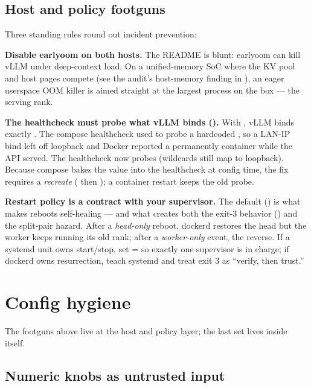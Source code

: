 \subsection{Host and policy footguns}

Three standing rules round out incident prevention:

\textbf{Disable earlyoom on both hosts.} The README is blunt: earlyoom can
kill vLLM under deep-context load. On a unified-memory SoC where the KV pool
and host pages compete (see the audit's host-memory finding in
), an eager userspace OOM killer is aimed straight at the
largest process on the box --- the serving rank.

\textbf{The healthcheck must probe what vLLM binds ().} With
, vLLM binds exactly . The
compose healthcheck used to probe a hardcoded , so a LAN-IP
bind left  off loopback and Docker reported a permanently
 container while the API served. The healthcheck now probes
 (wildcards still map to loopback). Because compose
bakes the value into the healthcheck at config time, the fix requires a
\emph{recreate} ( then ); a container restart keeps the
old probe.

\textbf{Restart policy is a contract with your supervisor.} The default
 () is what makes reboots
self-healing --- and what creates both the exit-3 behavior () and
the split-pair hazard. After a \emph{head-only} reboot, dockerd restores the
head but the worker keeps running its old rank; after a \emph{worker-only}
event, the reverse. If a systemd unit owns start/stop, set
= so exactly one supervisor is in
charge; if dockerd owns resurrection, teach systemd
 and treat exit 3 as ``verify, then trust.''

\section{Config hygiene}
\label{sec:ops-hygiene}

The footguns above live at the host and policy layer; the last set lives
inside  itself.

\subsection{Numeric knobs as untrusted input}

